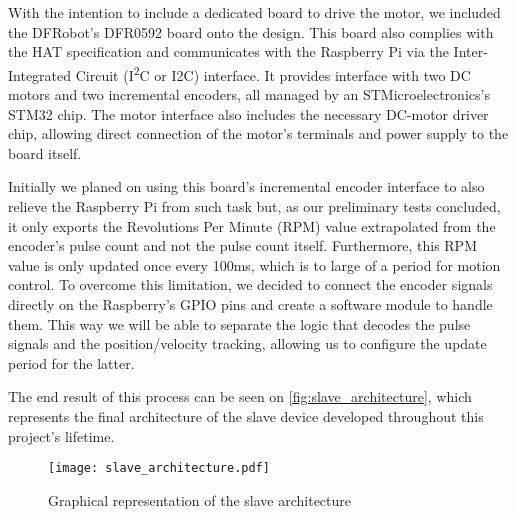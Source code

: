 With the intention to include a dedicated board to drive the motor, we included the DFRobot's DFR0592 \cite {hdw:dfr0592} board onto the design.
This board also complies with the HAT specification and communicates with the Raspberry Pi via the Inter-Integrated Circuit (I\textsuperscript{2}C or I2C) interface.
It provides interface with two DC motors and two incremental encoders, all managed by an STMicroelectronics's STM32 chip.
The motor interface also includes the necessary DC-motor driver chip, allowing direct connection of the motor's terminals and power supply to the board itself.

Initially we planed on using this board's incremental encoder interface to also relieve the Raspberry Pi from such task but, as our preliminary tests concluded, it only exports the Revolutions Per Minute (RPM) value extrapolated from the encoder's pulse count and not the pulse count itself.
Furthermore, this RPM value is only updated once every 100ms, which is to large of a period for motion control.
To overcome this limitation, we decided to connect the encoder signals directly on the Raspberry's GPIO pins and create a software module to handle them.
This way we will be able to separate the logic that decodes the pulse signals and the position/velocity tracking, allowing us to configure the update period for the latter.

The end result of this process can be seen on \autoref{fig:slave_architecture}, which represents the final architecture of the slave device developed throughout this project's lifetime.

\begin{figure}[htp]
	\centering
	\texttt{[image: slave\_architecture.pdf]}
	\caption{Graphical representation of the slave architecture}
	\label{fig:slave_architecture}
\end{figure}

